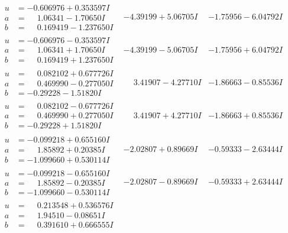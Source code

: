 \documentclass[1p]{elsarticle_modified}
\theoremstyle{definition}
\begin{document}
$$\begin{array}{c|c|c}
\begin{aligned}
u &= -0.606976 + 0.353597 I \\
a &= \phantom{-}1.06341 - 1.70650 I \\
b &= \phantom{-}0.169419 - 1.237650 I\end{aligned}
 & -4.39199 + 5.06705 I & -1.75956 - 6.04792 I \\ \hline\begin{aligned}
u &= -0.606976 - 0.353597 I \\
a &= \phantom{-}1.06341 + 1.70650 I \\
b &= \phantom{-}0.169419 + 1.237650 I\end{aligned}
 & -4.39199 - 5.06705 I & -1.75956 + 6.04792 I \\ \hline\begin{aligned}
u &= \phantom{-}0.082102 + 0.677726 I \\
a &= \phantom{-}0.469990 - 0.277050 I \\
b &= -0.29228 - 1.51820 I\end{aligned}
 & \phantom{-}3.41907 - 4.27710 I & -1.86663 - 0.85536 I \\ \hline\begin{aligned}
u &= \phantom{-}0.082102 - 0.677726 I \\
a &= \phantom{-}0.469990 + 0.277050 I \\
b &= -0.29228 + 1.51820 I\end{aligned}
 & \phantom{-}3.41907 + 4.27710 I & -1.86663 + 0.85536 I \\ \hline\begin{aligned}
u &= -0.099218 + 0.655160 I \\
a &= \phantom{-}1.85892 + 0.20385 I \\
b &= -1.099660 + 0.530114 I\end{aligned}
 & -2.02807 + 0.89669 I & -0.59333 - 2.63444 I \\ \hline\begin{aligned}
u &= -0.099218 - 0.655160 I \\
a &= \phantom{-}1.85892 - 0.20385 I \\
b &= -1.099660 - 0.530114 I\end{aligned}
 & -2.02807 - 0.89669 I & -0.59333 + 2.63444 I \\ \hline\begin{aligned}
u &= \phantom{-}0.213548 + 0.536576 I \\
a &= \phantom{-}1.94510 - 0.08651 I \\
b &= \phantom{-}0.391610 + 0.666555 I\end{aligned}

\end{array}$$
\end{document}
